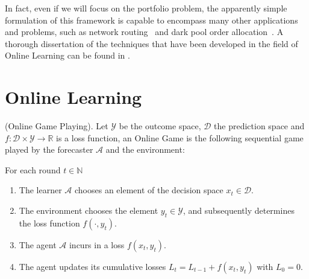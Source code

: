 In fact, even if we will focus on the portfolio problem, the apparently simple formulation of this framework is capable to encompass many other applications and problems, such as network routing~\cite{belmega2018online} and dark pool order allocation~\cite{agarwal2010optimal}. 
A thorough dissertation of the techniques that have been developed in the field of Online Learning can be found in \cite{cesa2006prediction}.

\section{Online Learning}
\label{sec:OnlineLearning}
\begin{definition}(Online Game Playing).\label{def:OGP}
    Let $\mathcal Y$ be the outcome space, $\mathcal D$ the prediction space and $f:\mathcal D\times\mathcal Y\to \mathbb R$ is a loss function, an Online Game is the following sequential game played by the forecaster $\mathcal A$ and the environment:

    For each round $t\in \mathbb N$
    \begin{enumerate}
        \item The learner $\mathcal A$ chooses an element of the decision space $x_t\in\mathcal D$.
        \item The environment chooses the element $y_t\in\mathcal Y$, and subsequently determines the loss function $f(\cdot,y_t)$.
        \item The agent $\mathcal A$ incurs in a loss $f(x_t,y_t)$.
		\item The agent updates its cumulative losses $L_t=L_{t-1}+f(x_t,y_t)$ with $L_0=0$.
    \end{enumerate}
\end{definition}

